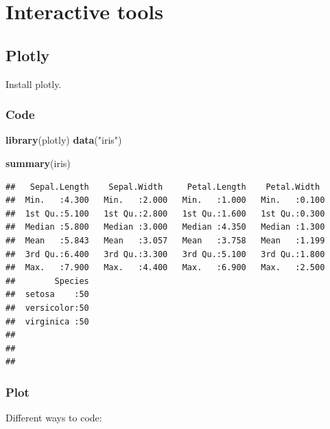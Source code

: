 \documentclass[
]{book}
\newenvironment{Shaded}{\begin{snugshade}}{\end{snugshade}}
\newcommand{\KeywordTok}[1]{\textcolor[rgb]{0.13,0.29,0.53}{\textbf{#1}}}
\newcommand{\NormalTok}[1]{#1}
\newcommand{\StringTok}[1]{\textcolor[rgb]{0.31,0.60,0.02}{#1}}
\begin{document}
\hypertarget{interactive-tools}{%
\chapter{Interactive tools}\label{interactive-tools}}

\hypertarget{plotly}{%
\section{Plotly}\label{plotly}}

Install plotly.

\hypertarget{code}{%
\subsection{Code}\label{code}}

\begin{Shaded}
\begin{Highlighting}[]
\KeywordTok{library}\NormalTok{(plotly)}
\KeywordTok{data}\NormalTok{(}\StringTok{"iris"}\NormalTok{)}

\KeywordTok{summary}\NormalTok{(iris)}
\end{Highlighting}
\end{Shaded}

\begin{verbatim}
##   Sepal.Length    Sepal.Width     Petal.Length    Petal.Width   
##  Min.   :4.300   Min.   :2.000   Min.   :1.000   Min.   :0.100  
##  1st Qu.:5.100   1st Qu.:2.800   1st Qu.:1.600   1st Qu.:0.300  
##  Median :5.800   Median :3.000   Median :4.350   Median :1.300  
##  Mean   :5.843   Mean   :3.057   Mean   :3.758   Mean   :1.199  
##  3rd Qu.:6.400   3rd Qu.:3.300   3rd Qu.:5.100   3rd Qu.:1.800  
##  Max.   :7.900   Max.   :4.400   Max.   :6.900   Max.   :2.500  
##        Species  
##  setosa    :50  
##  versicolor:50  
##  virginica :50  
##                 
##                 
## 
\end{verbatim}

\hypertarget{plot}{%
\subsection{Plot}\label{plot}}

Different ways to code:
\end{document}

